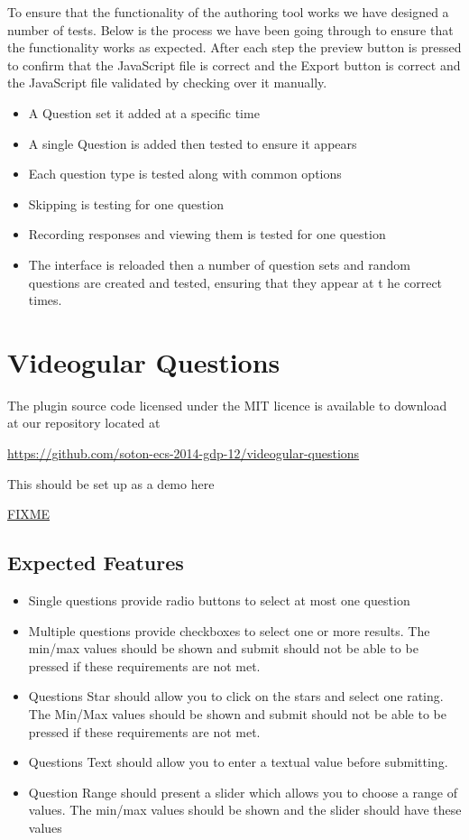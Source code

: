 \documentclass[12pt,a4paper]{article}
\begin{document}
To ensure that the functionality of the authoring tool works we have designed a number of tests. Below is the process we have been going through to ensure that the functionality works as expected. After each step the preview button is pressed to confirm that the JavaScript file is correct and the Export button is correct and the JavaScript file validated by checking over it manually.

\begin{itemize}
\item A Question set it added at a specific time
\item A single Question is added then tested to ensure it appears
\item Each question type is tested along with common options
\item Skipping is testing for one question
\item Recording responses and viewing them is tested for one question
\item The interface is reloaded then a number of question sets and random questions are created and tested, ensuring that they appear at t he correct times.
\end{itemize}

\section{Videogular Questions}

The plugin source code licensed under the MIT licence is available to download at our repository located at 

\url{https://github.com/soton-ecs-2014-gdp-12/videogular-questions}

This should be set up as a demo here

\url{FIXME}

\subsection{Expected Features}

\begin{itemize}
\item Single questions provide radio buttons to select at most one question
\item Multiple questions provide checkboxes to select one or more results. The min/max values should be shown and submit should not be able to be pressed if these requirements are not met.
\item Questions Star should allow you to click on the stars and select one rating. The Min/Max values should be shown and submit should not be able to be pressed if these requirements are not met.
\item Questions Text should allow you to enter a textual value before submitting.
\item Question Range should present a slider which allows you to choose a range of values. The min/max values should be shown and the slider should have these values
\end{itemize}
\end{document}
